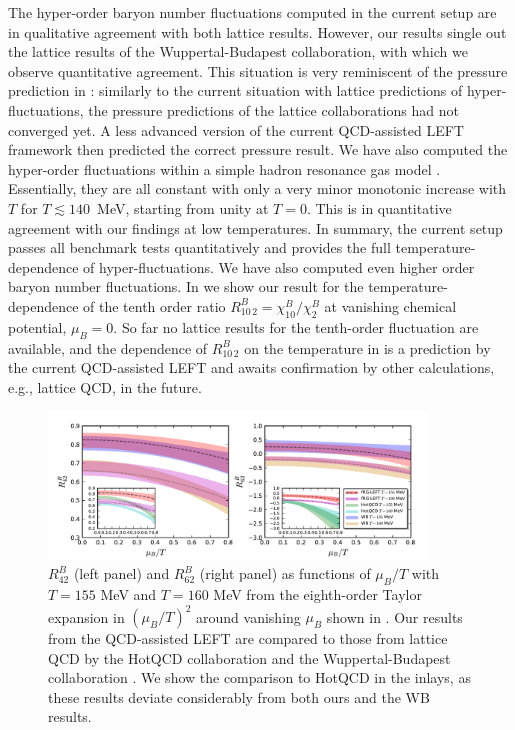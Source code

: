 \documentclass[%
reprint,
superscriptaddress,
showpacs,preprintnumbers,
amsmath,amssymb,
aps,
prd,
]{revtex4-1}
\def\Fig#1{\Cref{#1}}
\def\Eq#1{\Cref{#1}}
\begin{document}
The hyper-order baryon number fluctuations computed in the current setup are in qualitative agreement with both lattice results. However, our results single out the lattice results of the Wuppertal-Budapest collaboration, with which we observe quantitative agreement. This situation is very reminiscent of the pressure prediction in \cite{Herbst:2013ufa}: similarly to the current situation with lattice predictions of hyper-fluctuations, the pressure predictions of the lattice collaborations had not converged yet. A less advanced version of the current QCD-assisted LEFT framework then predicted the correct pressure result. 
We have also computed the hyper-order fluctuations within a simple hadron resonance gas model \cite{BraunMunzinger:2003zd}. Essentially, they are all constant with only a very minor monotonic increase with $T$ for $T \lesssim 140$~MeV, starting from unity at $T=0$. This is in quantitative agreement with our findings at low temperatures. In summary, the current setup passes all benchmark tests quantitatively and provides the full temperature-dependence of hyper-fluctuations. We have also computed even higher order baryon number fluctuations. In \Fig{fig:R102-T-muB0} we show our result for the temperature-dependence of the tenth order ratio $R^{B}_{10\,2}=\chi^{B}_{10}/\chi^{B}_{2}$ at vanishing chemical potential, $\mu_B=0$. So far no lattice results for the tenth-order fluctuation are available, and the dependence of $R^{B}_{10\,2}$ on the temperature in \Fig{fig:R102-T-muB0} is  a prediction by the current QCD-assisted LEFT and awaits confirmation by other calculations, e.g., lattice QCD, in the future.

%
\begin{figure}[t]
\includegraphics[width=0.9\textwidth]{R42R62-muBoT}
\caption{$R^{B}_{42}$ (left panel) and $R^{B}_{62}$ (right panel) as functions of $\mu_B/T$ with $T=155$ MeV and $T=160$ MeV from the eighth-order Taylor expansion in $(\mu_B/T)^2$ around vanishing $\mu_B$ shown in \Eq{eq:chiBTay}. Our results from the QCD-assisted LEFT are  compared to those from lattice QCD by the HotQCD collaboration \cite{Bazavov:2020bjn} and the Wuppertal-Budapest collaboration \cite{Borsanyi:2018grb}. We show the comparison to HotQCD in the inlays, as these results deviate considerably from both ours and the WB results.}\label{fig:R42R62-muBoT}
\end{figure}
%
\end{document}
